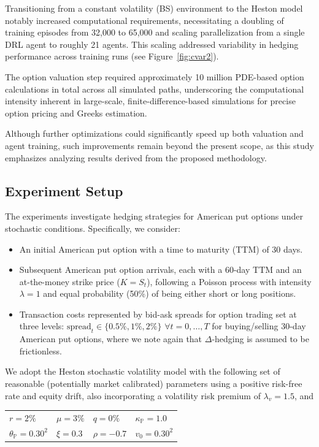 \documentclass[a4paper,fleqn]{cas-dc}
\begin{document}
Transitioning from a constant volatility (BS) environment to the Heston model notably increased computational requirements, necessitating a doubling of training episodes from 32,000 to 65,000 and scaling parallelization from a single DRL agent to roughly 21 agents. This scaling addressed variability in hedging performance across training runs (see Figure~\ref{fig:cvar2}).

The option valuation step required approximately 10 million PDE-based option calculations in total across all simulated paths, underscoring the computational intensity inherent in large-scale, finite-difference-based simulations for precise option pricing and Greeks estimation.

Although further optimizations could significantly speed up both valuation and agent training, such improvements remain beyond the present scope, as this study emphasizes analyzing results derived from the proposed methodology.


\subsection{Experiment Setup}

The experiments investigate hedging strategies for American put options under stochastic conditions. Specifically, we consider:
\begin{itemize}[noitemsep, leftmargin=1.5em, labelsep=0.5em]
    \item An initial American put option with a time to maturity (TTM) of 30 days.
    \item Subsequent American put option arrivals, each with a 60-day TTM and an at-the-money strike price ($K = S_t$), following a Poisson process with intensity $\lambda = 1$ and equal probability (50\%) of being either short or long positions.
    \item Transaction costs represented by bid-ask spreads for option trading set at three levels: $\text{spread}_t \in \{0.5\%, 1\%, 2\%\}$ $\forall t = 0, \ldots, T$ for buying/selling 30-day American put options, where we note again that $\Delta$-hedging is assumed to be frictionless.
\end{itemize}

\noindent We adopt the Heston stochastic volatility model with the following set of reasonable (potentially market calibrated) parameters using a positive risk-free rate and equity drift, also incorporating a volatility risk premium of $\lambda_v = 1.5$, and
\begin{center}
\begin{tabular}{@{}llll@{}}
$r = 2\%$ & $\mu=3\%$ & $ q=0\%$ & $\kappa_{\mathbb{P}} = 1.0$ \\
$\theta_{\mathbb{P}} = 0.30^2$ & $\xi = 0.3$ & $\rho = -0.7$ & $v_0 = 0.30^2$ \\
\end{tabular}
\end{center}
\end{document}
